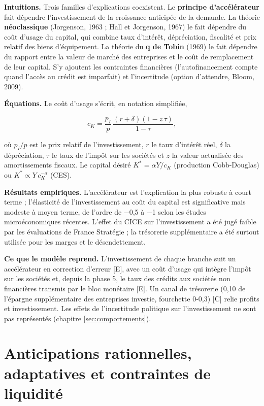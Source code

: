 \documentclass[
  11pt,
  11pt,
  a4paper,
  openany]{book}
\begin{document}
\textbf{Intuitions.} Trois familles d'explications coexistent. Le
\textbf{principe d'accélérateur} fait dépendre l'investissement de la
croissance anticipée de la demande. La théorie \textbf{néoclassique}
(Jorgenson, 1963 ; Hall et Jorgenson, 1967) le fait dépendre du coût
d'usage du capital, qui combine taux d'intérêt, dépréciation, fiscalité
et prix relatif des biens d'équipement. La théorie du \textbf{q de
Tobin} (1969) le fait dépendre du rapport entre la valeur de marché des
entreprises et le coût de remplacement de leur capital. S'y ajoutent les
contraintes financières (l'autofinancement compte quand l'accès au
crédit est imparfait) et l'incertitude (option d'attendre, Bloom, 2009).

\textbf{Équations.} Le coût d'usage s'écrit, en notation simplifiée,

\[c_K = \frac{p_I}{p}\,\frac{(r + \delta)(1 - z\,\tau)}{1 - \tau},\]

où \(p_I/p\) est le prix relatif de l'investissement, \(r\) le taux
d'intérêt réel, \(\delta\) la dépréciation, \(\tau\) le taux de l'impôt
sur les sociétés et \(z\) la valeur actualisée des amortissements
fiscaux. Le capital désiré \(K^* = \alpha Y / c_K\) (production
Cobb-Douglas) ou \(K^* \propto Y\,c_K^{-\sigma}\) (CES).

\textbf{Résultats empiriques.} L'accélérateur est l'explication la plus
robuste à court terme ; l'élasticité de l'investissement au coût du
capital est significative mais modeste à moyen terme, de l'ordre de −0,5
à −1 selon les études microéconomiques récentes. L'effet du CICE sur
l'investissement a été jugé faible par les évaluations de France
Stratégie ; la trésorerie supplémentaire a été surtout utilisée pour les
marges et le désendettement.

\textbf{Ce que le modèle reprend.} L'investissement de chaque branche
suit un accélérateur en correction d'erreur {[}E{]}, avec un coût
d'usage qui intègre l'impôt sur les sociétés et, depuis la phase 5, le
taux des crédits aux sociétés non financières transmis par le bloc
monétaire {[}E{]}. Un canal de trésorerie (0,10 de l'épargne
supplémentaire des entreprises investie, fourchette 0-0,3) {[}C{]} relie
profits et investissement. Les effets de l'incertitude politique sur
l'investissement ne sont pas représentés (chapitre
\ref{sec:comportements}).

\hypertarget{sec:anticipations}{%
\section{Anticipations rationnelles, adaptatives et contraintes de
liquidité}\label{sec:anticipations}}
\end{document}
